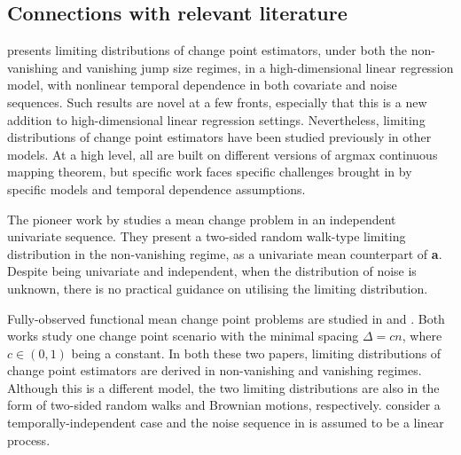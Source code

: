 \documentclass[11pt]{article}
\theoremstyle{plain}
\theoremstyle{definition}
\begin{document}
\subsection{Connections with relevant literature}\label{sec-rel-lit-result}


 presents limiting distributions of change point estimators, under both the non-vanishing and vanishing jump size regimes, in a high-dimensional linear regression model, with nonlinear temporal dependence in both covariate and noise sequences.  Such results are novel at a few fronts, especially that this is a new addition to high-dimensional linear regression settings.  Nevertheless, limiting distributions of change point estimators have been studied previously in other models.  At a high level, all are built on different versions of argmax continuous mapping theorem, but specific work faces specific challenges brought in by specific models and temporal dependence assumptions.  

The pioneer work by \cite{yao1989least} studies a mean change problem in an independent univariate sequence.  They present a two-sided random walk-type limiting distribution in the non-vanishing regime, as a univariate mean counterpart of \textbf{a}.  Despite being univariate and independent, when the distribution of noise is unknown, there is no practical guidance on utilising the limiting distribution.

Fully-observed functional mean change point problems are studied in \cite{aue2009estimation} and \cite{aue2018detecting}.  Both works study one change point scenario with the minimal spacing $\Delta = cn$, where $c \in (0, 1)$ being a constant.  In both these two papers, limiting distributions of change point estimators are derived in non-vanishing and vanishing regimes.  Although this is a different model, the two limiting distributions are also in the form of two-sided random walks and Brownian motions, respectively.  \cite{aue2009estimation} consider a temporally-independent case and the noise sequence in \cite{aue2018detecting} is assumed to be a linear process.
\end{document}
